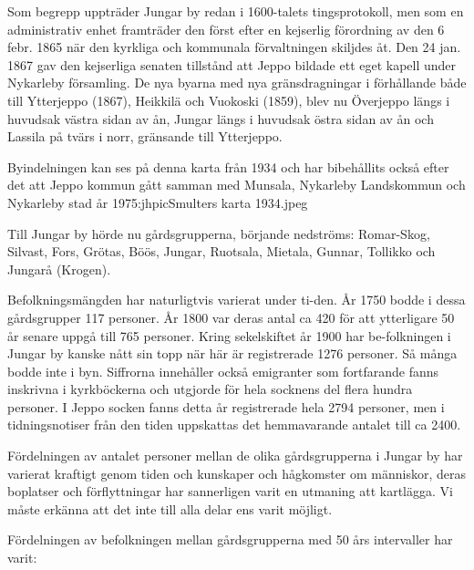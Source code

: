Som begrepp uppträder Jungar by redan i 1600-talets tingsprotokoll, men som en administrativ enhet framträder den först efter en kejserlig förordning av den 6 febr. 1865 när den kyrkliga och kommunala förvaltningen skiljdes åt. Den 24 jan. 1867 gav den kejserliga senaten tillstånd att Jeppo bildade ett eget kapell under Nykarleby församling. De nya byarna med nya gränsdragningar i förhållande både till Ytterjeppo (1867), Heikkilä och Vuokoski (1859), blev nu Överjeppo längs i huvudsak västra sidan av ån, Jungar längs i huvudsak östra sidan av ån och Lassila på tvärs i norr, gränsande till Ytterjeppo.

Byindelningen kan ses på denna karta från 1934 och har bibehållits också efter det att Jeppo kommun gått samman med Munsala, Nykarleby Landskommun och Nykarleby stad år 1975:jhpic{Smulters karta 1934.jpeg}

Till Jungar by hörde nu gårdsgrupperna, börjande nedströms: Romar-Skog, Silvast, Fors, Grötas, Böös, Jungar, Ruotsala, Mietala, Gunnar, Tollikko och Jungarå (Krogen).

Befolkningsmängden har naturligtvis varierat under ti-den. År 1750 bodde i dessa gårdsgrupper 117 personer. År 1800 var deras antal ca 420 för att ytterligare 50 år senare uppgå till 765 personer. Kring sekelskiftet år 1900 har be-folkningen i Jungar by kanske nått sin topp när här är registrerade 1276 personer.  Så många bodde inte i byn. Siffrorna innehåller också emigranter som fortfarande fanns inskrivna i kyrkböckerna och utgjorde för hela socknens del flera hundra personer. I Jeppo socken fanns detta år registrerade hela 2794  personer, men i tidningsnotiser från den tiden uppskattas det hemmavarande antalet till ca 2400.

Fördelningen av antalet personer mellan de olika gårdsgrupperna i Jungar by har varierat kraftigt genom tiden och kunskaper och hågkomster om människor, deras boplatser och förflyttningar har sannerligen varit en utmaning att kartlägga. Vi måste erkänna att det inte till alla delar ens varit möjligt.

Fördelningen av befolkningen mellan gårdsgrupperna med 50 års intervaller har varit:

